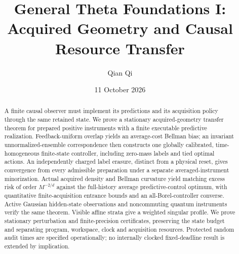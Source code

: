 \documentclass[11pt]{amsart}
\title[General Theta Foundations I]{General Theta Foundations I:\\Acquired Geometry and Causal Resource Transfer}
\author{Qian Qi}\date{11 October 2026}
\theoremstyle{definition}\newtheorem{definition}[theorem]{Definition}
\theoremstyle{remark}\newtheorem{remark}[theorem]{Remark}
\begin{document}
\raggedbottom
\begin{abstract}
A finite causal observer must implement its predictions and its acquisition policy through the same retained state. We prove a stationary acquired-geometry transfer theorem for prepared positive instruments with a finite executable predictive realization. Feedback-uniform overlap yields an average-cost Bellman bias; an invariant unnormalized-ensemble correspondence then constructs one globally calibrated, time-homogeneous finite-state controller, including zero-mass labels and tied optimal actions. An independently charged label erasure, distinct from a physical reset, gives convergence from every admissible preparation under a separate averaged-instrument minorization. Actual acquired density and Bellman curvature yield matching excess risk of order $M^{-2/d}$ against the full-history average predictive-control optimum, with quantitative finite-acquisition entrance bounds and an all-Borel-controller converse. Active Gaussian hidden-state observations and noncommuting quantum instruments verify the same theorem. Visible affine strata give a weighted singular profile. We prove stationary perturbation and finite-precision certificates, preserving the state budget and separating program, workspace, clock and acquisition resources. Protected random audit times are specified operationally; no internally clocked fixed-deadline result is extended by implication.
\end{abstract}\maketitle











\appendix

\end{document}
